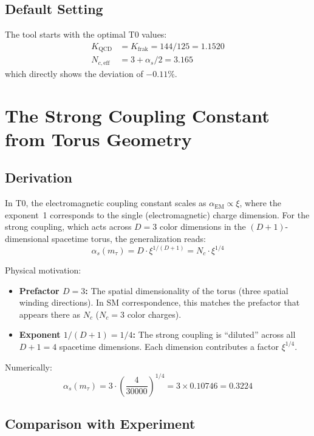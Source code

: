 	\subsection{Default Setting}
	
	The tool starts with the optimal T0 values:
	\begin{align}
		K_\text{QCD} &= K_\text{frak} = 144/125 = 1.1520 \\
		N_{c,\text{eff}} &= 3 + \alpha_s/2 = 3.165
	\end{align}
	which directly shows the deviation of $-0.11\%$.
	
	
	\section{The Strong Coupling Constant from Torus Geometry}
	\label{sec:alpha_s}
	
	\subsection{Derivation}
	
	In T0, the electromagnetic coupling constant scales as $\alpha_\text{EM} \propto \xi$, where the exponent~1 corresponds to the single (electromagnetic) charge dimension. For the strong coupling, which acts across $D = 3$ color dimensions in the $(D+1)$-dimensional spacetime torus, the generalization reads:
	\begin{equation}
		\alpha_s(m_\tau) = D \cdot \xi^{1/(D+1)} = N_c \cdot \xi^{1/4}
	\end{equation}
	
	Physical motivation:
	\begin{itemize}
		\item \textbf{Prefactor $D = 3$:} The spatial dimensionality of the torus (three spatial winding directions). In SM correspondence, this matches the prefactor that appears there as $N_c$ ($N_c=3$ color charges).
		\item \textbf{Exponent $1/(D+1) = 1/4$:} The strong coupling is ``diluted'' across all $D+1 = 4$ spacetime dimensions. Each dimension contributes a factor $\xi^{1/4}$.
	\end{itemize}
	
	Numerically:
	\begin{equation}
		\alpha_s(m_\tau) = 3 \cdot \left(\frac{4}{30000}\right)^{1/4} = 3 \times 0.10746 = 0.3224
	\end{equation}
	
	\subsection{Comparison with Experiment}
	
